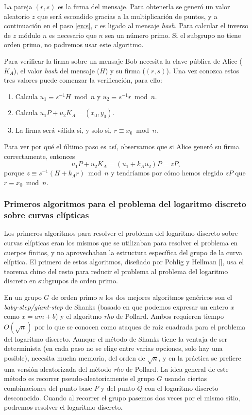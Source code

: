 \documentclass[
  a4paper,
  12pt,
  spanish,
]{scrartcl}
\begin{document}
La pareja $(r, s)$ es la firma del mensaje. Para obtenerla se generó un valor aleatorio $z$ que será escondido gracias a la multiplicación de puntos, y a continuación en el paso \ref{en:s}, $r$ es ligado al mensaje \textit{hash}. Para calcular el inverso de $z$ módulo $n$ es necesario que $n$ sea un número primo. Si el subgrupo no tiene orden primo, no podremos usar este algoritmo.

Para verificar la firma sobre un mensaje Bob necesita la clave pública de Alice ($K_A$), el valor \textit{hash} del mensaje ($H$) y su firma ($(r,s)$). Una vez conozca estos tres valores puede comenzar la verificación, para ello:

\begin{enumerate}
\item Calcula $u_1 \equiv s^{-1}H \bmod n$ y $u_2 \equiv s^{-1}r \bmod n$.
\item Calcula $u_1P + u_2 K_A = (x_0, y_0)$.
\item La firma será válida si, y solo si, $r \equiv x_0 \bmod n$.
\end{enumerate}

Para ver por qué el último paso es así, observamos que si Alice generó su firma correctamente, entonces \[u_1P+u_2K_A=(u_1+k_Au_2)P=zP,\] porque $z \equiv s^{-1}(H+k_Ar) \bmod n$ y tendríamos por cómo hemos elegido $zP$ que $r \equiv x_0 \bmod n$.

\subsubsection{Primeros algoritmos para el problema del logaritmo discreto sobre curvas elípticas}

Los primeros algoritmos para resolver el problema del logaritmo discreto sobre curvas elípticas eran los mismos que se utilizaban para resolver el problema en cuerpos finitos, y no aprovechaban la estructura específica del grupo de la curva elíptica. El primero de estos algoritmos, diseñado por Pohlig y Hellman [], usa el teorema chino del resto para reducir el problema al problema del logaritmo discreto en subgrupos de orden primo.

En un grupo $G$ de orden primo $n$ los dos mejores algoritmos genéricos son el \textit{baby-step/giant-step} de Shanks (basado en que podemos expresar un entero $x$ como $x = am + b$) y el algoritmo \textit{rho} de Pollard. Ambos requieren tiempo $O(\sqrt{n})$ por lo que se conocen como ataques de raíz cuadrada para el problema del logaritmo discreto. Aunque el método de Shanks tiene la ventaja de ser determinista (en cada paso no se elige entre varias opciones, solo hay una posible), necesita mucha memoria, del orden de $\sqrt{n}$, y en la práctica se prefiere una versión aleatorizada del método \textit{rho} de Pollard. La idea general de este método es recorrer pseudo-aleatoriamente el grupo $G$ usando ciertas combinaciones del punto base $P$ y del punto $Q$ con el logaritmo discreto desconocido. Cuando al recorrer el grupo pasemos dos veces por el mismo sitio, podremos resolver el logaritmo discreto.
\end{document}
